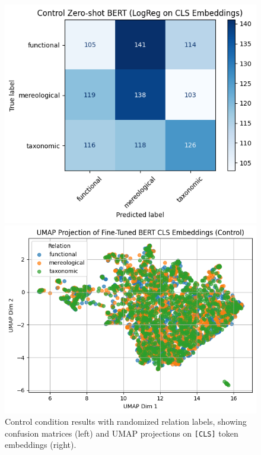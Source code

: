 \documentclass[stu,floatsintext]{apa7}
\begin{document}
\medskip
\begin{figure}[h]
  \centering
  \caption{Control condition results with randomized relation labels, showing confusion matrices (left) and UMAP projections on \texttt{[CLS]} token embeddings (right).}
  \begin{minipage}{0.45\textwidth}
    \centering
    \includegraphics[width=\linewidth]{cf-control.png}
  \end{minipage}
  \hspace{1cm} %
  \begin{minipage}{0.45\textwidth}
    \centering
    \includegraphics[width=\linewidth]{umap-control.png}
  \end{minipage}
  \label{fig:control}
\end{figure}
\end{document}
